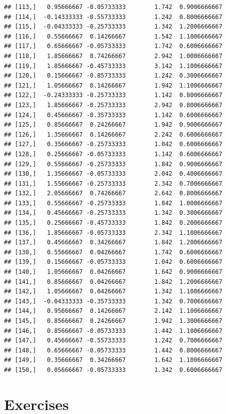 \documentclass[]{book}
\theoremstyle{definition}
\theoremstyle{definition}
\theoremstyle{definition}
\theoremstyle{remark}
\begin{document}
\begin{verbatim}
## [113,]   0.95666667 -0.05733333        1.742  0.9006666667
## [114,]  -0.14333333 -0.55733333        1.242  0.8006666667
## [115,]  -0.04333333 -0.25733333        1.342  1.2006666667
## [116,]   0.55666667  0.14266667        1.542  1.1006666667
## [117,]   0.65666667 -0.05733333        1.742  0.6006666667
## [118,]   1.85666667  0.74266667        2.942  1.0006666667
## [119,]   1.85666667 -0.45733333        3.142  1.1006666667
## [120,]   0.15666667 -0.85733333        1.242  0.3006666667
## [121,]   1.05666667  0.14266667        1.942  1.1006666667
## [122,]  -0.24333333 -0.25733333        1.142  0.8006666667
## [123,]   1.85666667 -0.25733333        2.942  0.8006666667
## [124,]   0.45666667 -0.35733333        1.142  0.6006666667
## [125,]   0.85666667  0.24266667        1.942  0.9006666667
## [126,]   1.35666667  0.14266667        2.242  0.6006666667
## [127,]   0.35666667 -0.25733333        1.042  0.6006666667
## [128,]   0.25666667 -0.05733333        1.142  0.6006666667
## [129,]   0.55666667 -0.25733333        1.842  0.9006666667
## [130,]   1.35666667 -0.05733333        2.042  0.4006666667
## [131,]   1.55666667 -0.25733333        2.342  0.7006666667
## [132,]   2.05666667  0.74266667        2.642  0.8006666667
## [133,]   0.55666667 -0.25733333        1.842  1.0006666667
## [134,]   0.45666667 -0.25733333        1.342  0.3006666667
## [135,]   0.25666667 -0.45733333        1.842  0.2006666667
## [136,]   1.85666667 -0.05733333        2.342  1.1006666667
## [137,]   0.45666667  0.34266667        1.842  1.2006666667
## [138,]   0.55666667  0.04266667        1.742  0.6006666667
## [139,]   0.15666667 -0.05733333        1.042  0.6006666667
## [140,]   1.05666667  0.04266667        1.642  0.9006666667
## [141,]   0.85666667  0.04266667        1.842  1.2006666667
## [142,]   1.05666667  0.04266667        1.342  1.1006666667
## [143,]  -0.04333333 -0.35733333        1.342  0.7006666667
## [144,]   0.95666667  0.14266667        2.142  1.1006666667
## [145,]   0.85666667  0.24266667        1.942  1.3006666667
## [146,]   0.85666667 -0.05733333        1.442  1.1006666667
## [147,]   0.45666667 -0.55733333        1.242  0.7006666667
## [148,]   0.65666667 -0.05733333        1.442  0.8006666667
## [149,]   0.35666667  0.34266667        1.642  1.1006666667
## [150,]   0.05666667 -0.05733333        1.342  0.6006666667
\end{verbatim}

\hypertarget{exercises-ch2}{%
\section{Exercises}\label{exercises-ch2}}
\end{document}
